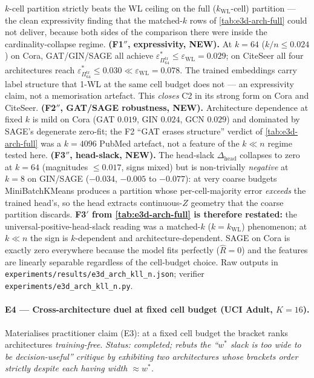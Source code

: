 \documentclass[10pt]{article}
\theoremstyle{definition}
\theoremstyle{remark}
\newcommand{\eps}{\varepsilon}
\begin{document}
\begin{table}[h]
{$k$-cell partition strictly beats the WL ceiling on the full
($k_{\mathrm{WL}}$-cell) partition --- the clean expressivity
finding that the matched-$k$ rows of \cref{tab:e3d-arch-full}
could not deliver, because both sides of the comparison there
were inside the cardinality-collapse regime.
\textbf{(F1$''$, expressivity, NEW).} At $k=64$ ($k/n \le
0.024$) on Cora, GAT/GIN/SAGE all achieve
$\eps^{*}_{\Pi^{\mathrm{tr}}_{64}} \le \eps_{\mathrm{WL}} =
0.029$; on CiteSeer all four architectures reach
$\eps^{*}_{\Pi^{\mathrm{tr}}_{64}} \le 0.030 \ll
\eps_{\mathrm{WL}} = 0.078$. The trained embeddings carry
label structure that 1-WL at the same cell budget does not ---
an expressivity claim, not a memorisation artefact. This
\emph{closes} C2 in its strong form on Cora and CiteSeer.
\textbf{(F2$''$, GAT/SAGE robustness, NEW).} Architecture
dependence at fixed $k$ is mild on Cora (GAT $0.019$, GIN
$0.024$, GCN $0.029$) and dominated by SAGE's degenerate
zero-fit; the F2 ``GAT erases structure'' verdict
of \cref{tab:e3d-arch-full} was a $k\!=\!4096$ PubMed artefact,
not a feature of the $k \ll n$ regime tested here.
\textbf{(F3$''$, head-slack, NEW).} The head-slack
$\Delta_{\mathrm{head}}$ collapses to zero at $k=64$
(magnitudes $\le 0.017$, signs mixed) but is non-trivially
\emph{negative} at $k=8$ on GIN/SAGE ($-0.034$, $-0.005$ to
$-0.077$): at very coarse budgets MiniBatchKMeans produces a
partition whose per-cell-majority error \emph{exceeds} the
trained head's, so the head extracts continuous-$Z$ geometry
that the coarse partition discards. \textbf{F3$'$ from
\cref{tab:e3d-arch-full} is therefore restated:} the
universal-positive-head-slack reading was a matched-$k$
($k=k_{\mathrm{WL}}$) phenomenon; at $k \ll n$ the sign is
$k$-dependent and architecture-dependent. SAGE on Cora is
exactly zero everywhere because the model fits perfectly
($\hat R = 0$) and the features are linearly separable
regardless of the cell-budget choice.
Raw outputs in \texttt{experiments/results/e3d\_arch\_kll\_n.json};
verifier \texttt{experiments/e3d\_arch\_kll\_n.py}.}
\label{tab:e3d-arch-kll-n}
\end{table}

\paragraph{E4 --- Cross-architecture duel at fixed cell budget
(UCI Adult, $K=16$).} Materialises practitioner claim (E3): at a
fixed cell budget the bracket ranks architectures
\emph{training-free}. \emph{Status: completed; rebuts the
``$w^{*}$ slack is too wide to be decision-useful'' critique by
exhibiting two architectures whose brackets order strictly
despite each having width $\approx w^{*}$.}
\end{document}
